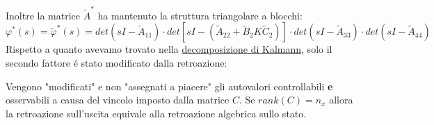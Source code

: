 \documentclass[../main.tex]{subfiles}
\begin{document}
		Inoltre la matrice $ \tilde A^{*} $ ha mantenuto la struttura triangolare a blocchi:
		\[
			\varphi^{*}(s) = \tilde \varphi^{*}(s) = det(sI-\tilde A_{11}) \cdot det[sI-(\tilde A_{22} + \tilde B_2 K \tilde C_2)] \cdot det(sI-\tilde A_{33}) \cdot det(sI-\tilde A_{44})
		\]
		Rispetto a quanto avevamo trovato nella \hyperref[sec:decomp_kalmann_polinomio]{decomposizione di Kalmann}, solo il secondo fattore \'e stato modificato dalla retroazione:
		\begin{center}
		\end{center}
		Vengono "modificati" e non "assegnati a piacere" gli autovalori controllabili \textbf{e} osservabili a causa del vincolo imposto dalla matrice $ C $. Se $ rank(C) = n_x $ allora la retroazione sull'uscita equivale alla retroazione algebrica sullo stato.
		
\end{document}
